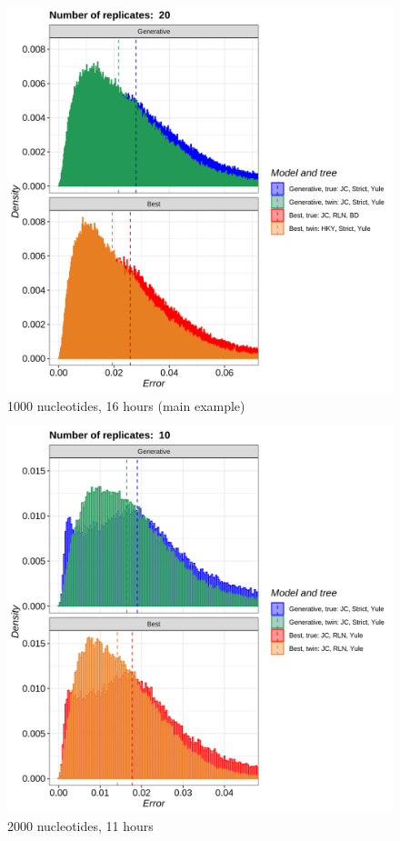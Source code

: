 \begin{figure}[H]
  \includegraphics[width=\textwidth]{pirouette_example_28/errors.png}
  \caption{1000 nucleotides, 16 hours (main example)}
\end{figure}

\begin{figure}[H]
  \includegraphics[width=\textwidth]{pirouette_example_34/errors.png}
  \caption{2000 nucleotides, 11 hours}
\end{figure}


